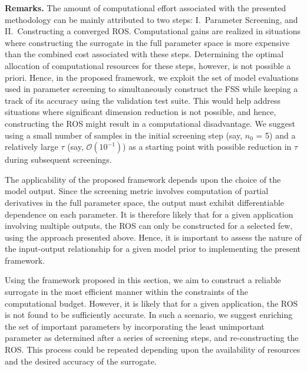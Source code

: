 \textbf{Remarks.}
The amount of computational effort associated with the presented methodology
can be mainly attributed to two steps: I.~Parameter Screening, and 
II.~Constructing a converged ROS. Computational gains are realized in situations
where constructing the surrogate in the full parameter space is more expensive
than the combined cost associated with these steps. Determining the optimal
allocation of computational resources for these steps, however, is not possible
a priori. Hence, in the proposed framework, we exploit the set of model
evaluations used in parameter screening to simultaneously construct the FSS
while keeping a track of its accuracy using the validation test suite. This
would help address situations where significant dimension reduction is not
possible, and hence, constructing the ROS might result in a computational
disadvantage. We suggest using a small number of samples in the initial
screening step (say, $n_0$ = 5) and a relatively large $\tau$ (say,
$\mathcal{O}(10^{-1})$) as a starting point with possible reduction in $\tau$
during subsequent screenings. 


The applicability of the proposed framework depends upon the choice of the
model output.  Since the screening metric involves computation of partial
derivatives in the full parameter space, the output must exhibit differentiable
dependence on each parameter. It is therefore likely that for a given
application involving multiple outputs, the ROS can only be constructed for a
selected few, using the approach presented above.  Hence, it is important to
assess the nature of the input-output relationship for a given model prior to
implementing the present framework.

Using the framework proposed in this section, we aim to construct a reliable
surrogate in the most efficient manner within the constraints of the computational
budget. However, it is likely that for a given application, the ROS is not
found to be sufficiently accurate. In such a scenario, we suggest enriching the
set of important parameters by incorporating the least unimportant parameter
as determined after a series of screening steps, and re-constructing the ROS. 
This process could be repeated depending upon the availability of resources
and the desired accuracy of the surrogate.  


